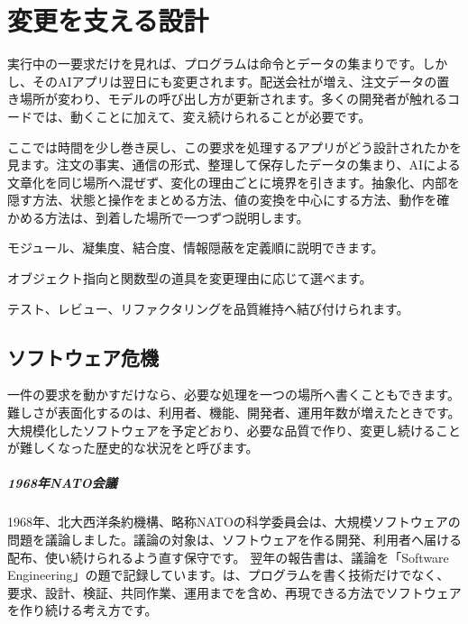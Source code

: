 \chapter{変更を支える設計}
\label{chap:software-engineering}

\begin{chapterabstract}
実行中の一要求だけを見れば、プログラムは命令とデータの集まりです。しかし、そのAIアプリは翌日にも変更されます。配送会社が増え、注文データの置き場所が変わり、モデルの呼び出し方が更新されます。多くの開発者が触れるコードでは、動くことに加えて、変え続けられることが必要です。

ここでは時間を少し巻き戻し、この要求を処理するアプリがどう設計されたかを見ます。注文の事実、通信の形式、整理して保存したデータの集まり、AIによる文章化を同じ場所へ混ぜず、変化の理由ごとに境界を引きます。抽象化、内部を隠す方法、状態と操作をまとめる方法、値の変換を中心にする方法、動作を確かめる方法は、到着した場所で一つずつ説明します。
\end{chapterabstract}

\begin{learninggoals}
  \item モジュール、凝集度、結合度、情報隠蔽を定義順に説明できます。
  \item オブジェクト指向と関数型の道具を変更理由に応じて選べます。
  \item テスト、レビュー、リファクタリングを品質維持へ結び付けられます。
\end{learninggoals}



\section{ソフトウェア危機}
\label{sec:04-software-engineering-01}

一件の要求を動かすだけなら、必要な処理を一つの場所へ書くこともできます。難しさが表面化するのは、利用者、機能、開発者、運用年数が増えたときです。大規模化したソフトウェアを予定どおり、必要な品質で作り、変更し続けることが難しくなった歴史的な状況をと呼びます。

\begingroup
\begingroup
\paragraph{1968年NATO会議}
        1968年、北大西洋条約機構、略称NATOの科学委員会は、大規模ソフトウェアの問題を議論しました。議論の対象は、ソフトウェアを作る開発、利用者へ届ける配布、使い続けられるよう直す保守です。
        翌年の報告書は、議論を「Software Engineering」の題で記録しています。は、プログラムを書く技術だけでなく、要求、設計、検証、共同作業、運用までを含め、再現できる方法でソフトウェアを作り続ける考え方です。

